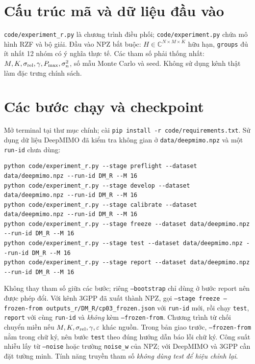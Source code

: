 \documentclass[conference,onecolumn,10pt]{IEEEtran}
\begin{document}
\section{Cấu trúc mã và dữ liệu đầu vào}
\texttt{code/experiment\_r.py} là chương trình điều phối; \texttt{code/experiment.py} chứa mô hình RZF và bộ giải. Đầu vào NPZ bắt buộc: $H\in\mathbb C^{N\times M\times K}$ hữu hạn, \texttt{groups} đủ ít nhất 12 nhóm có ý nghĩa thực tế. Các tham số phải thống nhất: $M,K,\sigma_{\rm rel},\gamma,P_{\max},\sigma_n^2$, số mẫu Monte Carlo và seed. Không sử dụng kênh thật làm đặc trưng chính sách.
\section{Các bước chạy và checkpoint}
Mở terminal tại thư mục chính; cài \texttt{pip install -r code/requirements.txt}. Sử dụng dữ liệu DeepMIMO đã kiểm tra không gian ở \texttt{data/deepmimo.npz} và một \texttt{run-id} chưa dùng:
\begin{verbatim}
python code/experiment_r.py --stage preflight --dataset data/deepmimo.npz --run-id DM_R --M 16
python code/experiment_r.py --stage develop --dataset data/deepmimo.npz --run-id DM_R --M 16
python code/experiment_r.py --stage calibrate --dataset data/deepmimo.npz --run-id DM_R --M 16
python code/experiment_r.py --stage freeze --dataset data/deepmimo.npz --run-id DM_R --M 16
python code/experiment_r.py --stage test --dataset data/deepmimo.npz --run-id DM_R --M 16
python code/experiment_r.py --stage report --dataset data/deepmimo.npz --run-id DM_R --M 16
\end{verbatim}
Không thay tham số giữa các bước; riêng \texttt{--bootstrap} chỉ dùng ở bước report nên được phép đổi. Với kênh 3GPP đã xuất thành NPZ, gọi \texttt{--stage freeze --frozen-from outputs\_r/DM\_R/cp03\_frozen.json} với \texttt{run-id} mới, rồi chạy \texttt{test}, \texttt{report} với cùng \texttt{run-id} và \emph{không} kèm \texttt{--frozen-from}. Chương trình từ chối chuyển miền nếu $M,K,\sigma_{\rm rel},\gamma,\varepsilon$ khác nguồn. Trong bản giao trước, \texttt{--frozen-from} nằm trong chữ ký, nên bước \texttt{test} theo đúng hướng dẫn báo lỗi chữ ký. Công suất nhiễu lấy từ \texttt{--noise} hoặc trường \texttt{noise\_w} của NPZ; với DeepMIMO và 3GPP cần đặt tường minh. Tính năng truyền tham số \textit{không dùng test để hiệu chỉnh lại}.
\end{document}
